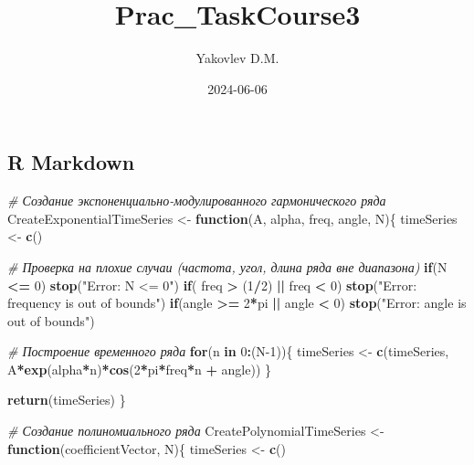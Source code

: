 \documentclass[
]{article}
\title{Prac\_TaskCourse3}
\author{Yakovlev D.M.}
\date{2024-06-06}
\newenvironment{Shaded}{\begin{snugshade}}{\end{snugshade}}
\newcommand{\CommentTok}[1]{\textcolor[rgb]{0.56,0.35,0.01}{\textit{#1}}}
\newcommand{\ControlFlowTok}[1]{\textcolor[rgb]{0.13,0.29,0.53}{\textbf{#1}}}
\newcommand{\DecValTok}[1]{\textcolor[rgb]{0.00,0.00,0.81}{#1}}
\newcommand{\FunctionTok}[1]{\textcolor[rgb]{0.13,0.29,0.53}{\textbf{#1}}}
\newcommand{\NormalTok}[1]{#1}
\newcommand{\OtherTok}[1]{\textcolor[rgb]{0.56,0.35,0.01}{#1}}
\newcommand{\SpecialCharTok}[1]{\textcolor[rgb]{0.81,0.36,0.00}{\textbf{#1}}}
\newcommand{\StringTok}[1]{\textcolor[rgb]{0.31,0.60,0.02}{#1}}
\begin{document}
\maketitle

\subsection{R Markdown}\label{r-markdown}

\begin{Shaded}
\begin{Highlighting}[]
\CommentTok{\# Создание экспоненциально{-}модулированного гармонического ряда}
\NormalTok{CreateExponentialTimeSeries }\OtherTok{\textless{}{-}} \ControlFlowTok{function}\NormalTok{(A, alpha, freq, angle, N)\{}
\NormalTok{  timeSeries }\OtherTok{\textless{}{-}} \FunctionTok{c}\NormalTok{()}
  
  \CommentTok{\# Проверка на плохие случаи (частота, угол, длина ряда вне диапазона)}
  \ControlFlowTok{if}\NormalTok{(N }\SpecialCharTok{\textless{}=} \DecValTok{0}\NormalTok{) }\FunctionTok{stop}\NormalTok{(}\StringTok{"Error: N \textless{}= 0"}\NormalTok{)}
  \ControlFlowTok{if}\NormalTok{( freq }\SpecialCharTok{\textgreater{}}\NormalTok{ (}\DecValTok{1}\SpecialCharTok{/}\DecValTok{2}\NormalTok{) }\SpecialCharTok{||}\NormalTok{ freq }\SpecialCharTok{\textless{}} \DecValTok{0}\NormalTok{) }\FunctionTok{stop}\NormalTok{(}\StringTok{"Error: frequency is out of bounds"}\NormalTok{)}
  \ControlFlowTok{if}\NormalTok{(angle }\SpecialCharTok{\textgreater{}=} \DecValTok{2}\SpecialCharTok{*}\NormalTok{pi }\SpecialCharTok{||}\NormalTok{ angle }\SpecialCharTok{\textless{}} \DecValTok{0}\NormalTok{) }\FunctionTok{stop}\NormalTok{(}\StringTok{"Error: angle is out of bounds"}\NormalTok{)}
  
  \CommentTok{\# Построение временного ряда}
  \ControlFlowTok{for}\NormalTok{(n }\ControlFlowTok{in} \DecValTok{0}\SpecialCharTok{:}\NormalTok{(N}\DecValTok{{-}1}\NormalTok{))\{}
\NormalTok{    timeSeries }\OtherTok{\textless{}{-}} \FunctionTok{c}\NormalTok{(timeSeries, A}\SpecialCharTok{*}\FunctionTok{exp}\NormalTok{(alpha}\SpecialCharTok{*}\NormalTok{n)}\SpecialCharTok{*}\FunctionTok{cos}\NormalTok{(}\DecValTok{2}\SpecialCharTok{*}\NormalTok{pi}\SpecialCharTok{*}\NormalTok{freq}\SpecialCharTok{*}\NormalTok{n }\SpecialCharTok{+}\NormalTok{ angle))}
\NormalTok{  \}}
  
  \FunctionTok{return}\NormalTok{(timeSeries)}
\NormalTok{\}}


\CommentTok{\# Создание полиномиального ряда}
\NormalTok{CreatePolynomialTimeSeries }\OtherTok{\textless{}{-}} \ControlFlowTok{function}\NormalTok{(coefficientVector, N)\{}
\NormalTok{  timeSeries }\OtherTok{\textless{}{-}} \FunctionTok{c}\NormalTok{()}
  

\end{Highlighting}
\end{Shaded}
\end{document}
